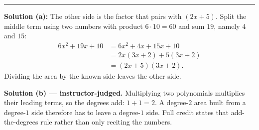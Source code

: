 \documentclass[12pt]{article}
\begin{document}
\vspace{0.2cm}\noindent\rule{\linewidth}{0.2pt}


\textbf{Solution (a):} \quad The other side is the factor that pairs with $(2x+5)$. Split the middle
term using two numbers with product $6\cdot 10 = 60$ and sum $19$, namely $4$ and $15$:
\begin{align*}
  6x^2 + 19x + 10 &= 6x^2 + 4x + 15x + 10\\
                  &= 2x(3x+2) + 5(3x+2)\\
                  &= (2x+5)(3x+2).
\end{align*}
Dividing the area by the known side leaves the other side. 

\noindent\textbf{Solution (b) --- instructor-judged.} Multiplying two polynomials multiplies
their leading terms, so the degrees add: $1 + 1 = 2$. A degree-$2$ area built from a degree-$1$
side therefore has to leave a degree-$1$ side. Full credit states that add-the-degrees rule
rather than only reciting the numbers.
\end{document}
